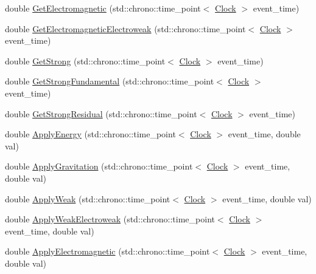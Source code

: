 \begin{DoxyCompactItemize}
\item 
double \hyperlink{class_elementary_force_a2c8bc3226f42710717775c73eee1644e}{Get\+Electromagnetic} (std\+::chrono\+::time\+\_\+point$<$ \hyperlink{universe_8h_a0ef8d951d1ca5ab3cfaf7ab4c7a6fd80}{Clock} $>$ event\+\_\+time)
\item 
double \hyperlink{class_elementary_force_a58e503f2f3a7410f034a2a04bca560d1}{Get\+Electromagnetic\+Electroweak} (std\+::chrono\+::time\+\_\+point$<$ \hyperlink{universe_8h_a0ef8d951d1ca5ab3cfaf7ab4c7a6fd80}{Clock} $>$ event\+\_\+time)
\item 
double \hyperlink{class_elementary_force_aaa1cde27b1508831f67353eb39745a7e}{Get\+Strong} (std\+::chrono\+::time\+\_\+point$<$ \hyperlink{universe_8h_a0ef8d951d1ca5ab3cfaf7ab4c7a6fd80}{Clock} $>$ event\+\_\+time)
\item 
double \hyperlink{class_elementary_force_a0974d6537c07dac2453d2a607324fa21}{Get\+Strong\+Fundamental} (std\+::chrono\+::time\+\_\+point$<$ \hyperlink{universe_8h_a0ef8d951d1ca5ab3cfaf7ab4c7a6fd80}{Clock} $>$ event\+\_\+time)
\item 
double \hyperlink{class_elementary_force_a3478c8ad35bce240055da7d4a03e555e}{Get\+Strong\+Residual} (std\+::chrono\+::time\+\_\+point$<$ \hyperlink{universe_8h_a0ef8d951d1ca5ab3cfaf7ab4c7a6fd80}{Clock} $>$ event\+\_\+time)
\item 
double \hyperlink{class_elementary_force_a0961328b260cb4dfb2ba54f4e284f0e8}{Apply\+Energy} (std\+::chrono\+::time\+\_\+point$<$ \hyperlink{universe_8h_a0ef8d951d1ca5ab3cfaf7ab4c7a6fd80}{Clock} $>$ event\+\_\+time, double val)
\item 
double \hyperlink{class_elementary_force_a655a2c9489bfbbf15e05ba4953628134}{Apply\+Gravitation} (std\+::chrono\+::time\+\_\+point$<$ \hyperlink{universe_8h_a0ef8d951d1ca5ab3cfaf7ab4c7a6fd80}{Clock} $>$ event\+\_\+time, double val)
\item 
double \hyperlink{class_elementary_force_aabf66a859e6e808a65c6929cd16f7597}{Apply\+Weak} (std\+::chrono\+::time\+\_\+point$<$ \hyperlink{universe_8h_a0ef8d951d1ca5ab3cfaf7ab4c7a6fd80}{Clock} $>$ event\+\_\+time, double val)
\item 
double \hyperlink{class_elementary_force_a2d3a5444c771f35d66d4151c62f53b12}{Apply\+Weak\+Electroweak} (std\+::chrono\+::time\+\_\+point$<$ \hyperlink{universe_8h_a0ef8d951d1ca5ab3cfaf7ab4c7a6fd80}{Clock} $>$ event\+\_\+time, double val)
\item 
double \hyperlink{class_elementary_force_a0045a3380e468c6cfdbefce829888c1f}{Apply\+Electromagnetic} (std\+::chrono\+::time\+\_\+point$<$ \hyperlink{universe_8h_a0ef8d951d1ca5ab3cfaf7ab4c7a6fd80}{Clock} $>$ event\+\_\+time, double val)

\end{DoxyCompactItemize}
